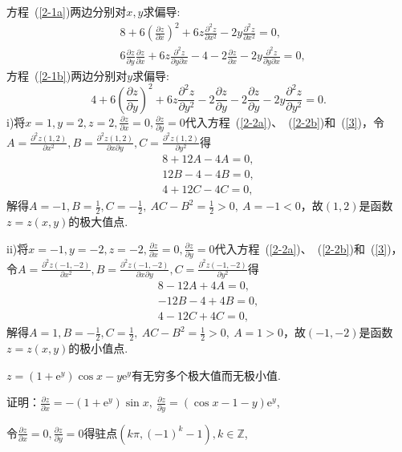\documentclass[12pt,UTF8]{ctexart}
\begin{document}
\begin{enumerate}
方程~(\ref{2-1a})两边分别对$x,y$求偏导:
\begin{subequations}
\begin{align}
&8+6(\frac{\partial z}{\partial x})^2+6z\frac{\partial^2z}{\partial x^2}-2y\frac{\partial^2z}{\partial x^2}=0,\label{2-2a}\\
&6\frac{\partial z}{\partial y}\frac{\partial z}{\partial x}+6z\frac{\partial^2z}{\partial y\partial x}-4-2\frac{\partial z}{\partial x}-2y\frac{\partial^2z}{\partial y\partial x}=0,\label{2-2b}
\end{align}
\end{subequations}
方程~(\ref{2-1b})两边分别对$y$求偏导:
\begin{equation}\label{3}
4+6(\frac{\partial z}{\partial y})^2+6z\frac{\partial^2z}{\partial y^2}-2\frac{\partial z}{\partial y}-2\frac{\partial z}{\partial y}-2y\frac{\partial^2z}{\partial y^2}=0.
\end{equation}
i)将$x=1,y=2,z=2,\frac{\partial z}{\partial x}=0,\frac{\partial z}{\partial y}=0$代入方程~(\ref{2-2a})、~(\ref{2-2b})和~(\ref{3})，令$A=\frac{\partial^2z(1,2)}{\partial x^2},B=\frac{\partial^2z(1,2)}{\partial x\partial y},C=\frac{\partial^2z(1,2)}{\partial y^2}$得
\[\begin{split}
8+12A-4A=0,\\
12B-4-4B=0,\\
4+12C-4C=0,
\end{split}\]
解得$A=-1,B=\frac12,C=-\frac12,\ AC-B^2=\frac12>0,\ A=-1<0$，故$(1,2)$是函数$z=z(x,y)$的极大值点.

ii)将$x=-1,y=-2,z=-2,\frac{\partial z}{\partial x}=0,\frac{\partial z}{\partial y}=0$代入方程~(\ref{2-2a})、~(\ref{2-2b})和~(\ref{3})，令$A=\frac{\partial^2z(-1,-2)}{\partial x^2},B=\frac{\partial^2z(-1,-2)}{\partial x\partial y},C=\frac{\partial^2z(-1,-2)}{\partial y^2}$得
\[\begin{split}
8-12A+4A=0,\\
-12B-4+4B=0,\\
4-12C+4C=0,
\end{split}\]解得$A=1,B=-\frac12,C=\frac12,\ AC-B^2=\frac12>0,\ A=1>0$，故$(-1,-2)$是函数$z=z(x,y)$的极小值点.

$z=(1+\mathrm e^y)\cos x-y\mathrm e^y$有无穷多个极大值而无极小值.

证明：$\frac{\partial z}{\partial x}=-(1+\mathrm e^y)\sin x,\ \frac{\partial z}{\partial y}=(\cos x-1-y)\mathrm e^y$,

令$\frac{\partial z}{\partial x}=0,\frac{\partial z}{\partial y}=0$得驻点$(k\pi,(-1)^k-1),k\in\mathbb Z$,


\end{enumerate}
\end{document}
